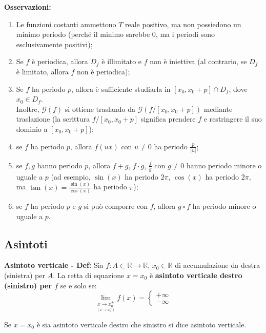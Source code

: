 \documentclass{article}
\begin{document}
\noindent\textbf{Osservazioni:} 
\begin{enumerate}
    \item Le funzioni costanti ammettono $T$ reale positivo, ma non possiedono un minimo periodo (perché il minimo sarebbe $0$, ma i periodi sono esclusivamente positivi);
    \item Se $f$ è periodica, allora $D_f$ è illimitato e $f$ non è iniettiva (al contrario, se $D_f$ è limitato, allora $f$ non è periodica);
    \item Se $f$ ha periodo $p$, allora è sufficiente studiarla in $[x_0, x_0 + p] \cap D_f$, dove $x_0 \in D_f$.\\
    Inoltre, $\mathcal{G}(f)$ si ottiene traslando da $\mathcal{G}(f/[x_0, x_0 + p])$ mediante traslazione (la scrittura $f/[x_0, x_0 + p]$ significa prendere $f$ e restringere il suo dominio a $[x_0, x_0 + p]$);
    \item se $f$ ha periodo $p$, allora $f(ux)$ con $u \neq 0$ ha periodo $\frac{p}{|u|}$;
    \item se $f, g$ hanno periodo $p$, allora $f + g$, $f \cdot g$, $\frac{f}{g}$ con $g \neq 0$ hanno periodo minore o uguale a $p$ (ad esempio, $\sin(x)$ ha periodo $2\pi$, $\cos(x)$ ha periodo $2\pi$, ma $\tan(x) = \frac{\sin(x)}{\cos(x)}$ ha periodo $\pi$);
    \item se $f$ ha periodo $p$ e $g$ si può comporre con $f$, allora $g \circ f$ ha periodo minore o uguale a $p$.
\end{enumerate}

\subsection{Asintoti}
\textbf{Asintoto verticale - Def:} Sia $f: A \subset \mathbb{R} \xrightarrow{} \mathbb{R}$, $x_0 \in \mathbb{R}$ di accumulazione da destra (sinistra) per $A$. La retta di equazione $x = x_0$ è \textbf{asintoto verticale destro (sinistro) per $f$} se e solo se:
\begin{equation*}
    \lim_{\underset{\scriptstyle (x \to x_0^-)}{x \to x_0^+}} f(x) = \begin{cases}
        +\infty \\
        -\infty
    \end{cases}
\end{equation*}

\noindent Se $x = x_0$ è sia asintoto verticale destro che sinistro si dice asintoto verticale.\\
\end{document}
